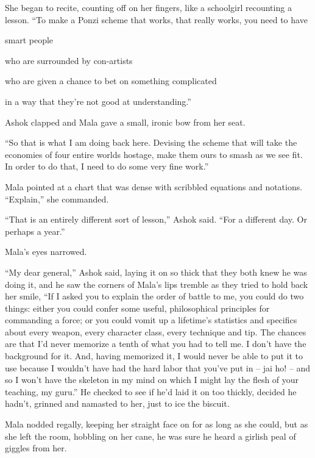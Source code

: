 She began to recite, counting off on her fingers, like a schoolgirl
recounting a lesson. ``To make a Ponzi scheme that works, that
really works, you need to have

smart people

who are surrounded by con-artists

who are given a chance to bet on something complicated

in a way that they're not good at understanding.''

Ashok clapped and Mala gave a small, ironic bow from her seat.

``So that is what I am doing back here. Devising the scheme that
will take the economies of four entire worlds hostage, make them
ours to smash as we see fit. In order to do that, I need to do some
very fine work.''

Mala pointed at a chart that was dense with scribbled equations and
notations. ``Explain,'' she commanded.

``That is an entirely different sort of lesson,'' Ashok said. ``For a
different day. Or perhaps a year.''

Mala's eyes narrowed.

``My dear general,'' Ashok said, laying it on so thick that they both
knew he was doing it, and he saw the corners of Mala's lips tremble
as they tried to hold back her smile, ``If I asked you to explain
the order of battle to me, you could do two things: either you
could confer some useful, philosophical principles for commanding a
force; or you could vomit up a lifetime's statistics and specifics
about every weapon, every character class, every technique and tip.
The chances are that I'd never memorize a tenth of what you had to
tell me. I don't have the background for it. And, having memorized
it, I would never be able to put it to use because I wouldn't have
had the hard labor that you've put in -- jai ho! -- and so I won't
have the skeleton in my mind on which I might lay the flesh of your
teaching, my guru.'' He checked to see if he'd laid it on too
thickly, decided he hadn't, grinned and namasted to her, just to
ice the biscuit.

Mala nodded regally, keeping her straight face on for as long as
she could, but as she left the room, hobbling on her cane, he was
sure he heard a girlish peal of giggles from her.

\tb

